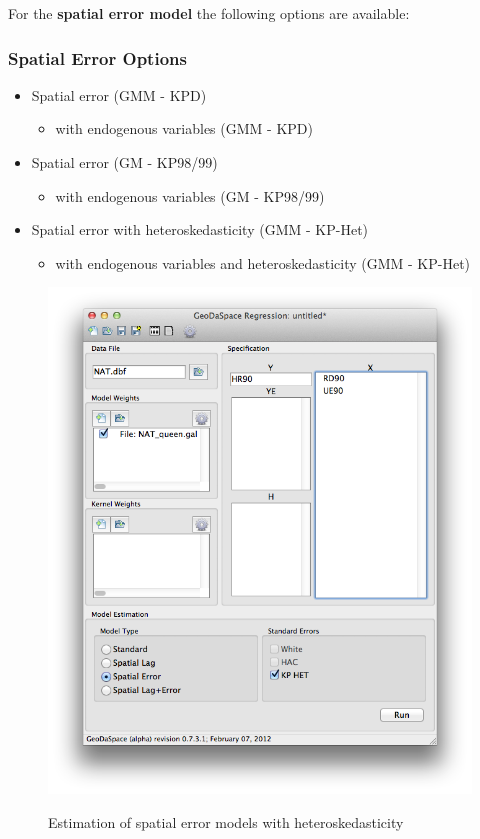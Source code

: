 \documentclass{article}
\begin{document}
For the \textbf{spatial error model} the following options are available:

\subsubsection*{Spatial Error Options}
\begin{itemize}
\item Spatial error (GMM - KPD)
      \begin{itemize}
	\item with endogenous variables (GMM - KPD)
       \end{itemize}
\item Spatial error (GM - KP98/99)
      \begin{itemize}
	\item with endogenous variables (GM - KP98/99)
      \end{itemize}
\item Spatial error with heteroskedasticity (GMM - KP-Het)
      \begin{itemize}
	\item with endogenous variables and heteroskedasticity  (GMM - KP-Het)
      \end{itemize}
\end{itemize}

\begin{figure}[htb]
\begin{center}
\includegraphics[width=0.7\linewidth]{GS_het.png}\\
\caption{Estimation of spatial error models with heteroskedasticity}
\label{f:GS_het}
\end{center}
\end{figure}
\end{document}
